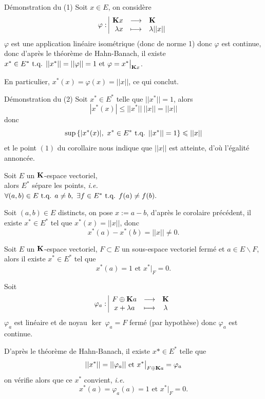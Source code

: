 \documentclass[a4paper,11pt, twoside]{article}
\begin{document}
\begin{ProofC}{Démonstration du (1)}
  Soit $x\in  E$, on considère 
  $$\varphi:\begin{array}{|rcl}
    \mathbf K x&\longrightarrow&\mathbf K\\
    \lambda x&\longmapsto&\lambda||x||
  \end{array}$$
  $\varphi$ est une application linéaire isométrique (donc de norme 1) donc $\varphi$ est continue, donc d'après le théorème de Hahn-Banach, il existe $x^*\in E^*\text{ t.q. } ||x^*||=||\varphi||=1\text{ et }\varphi=x^*\big|_{\mathbf K x}$.

  En particulier, $x^*(x)=\varphi(x)=||x||$, ce qui conclut.
\end{ProofC}


\begin{ProofC}{Démonstration du (2)}
  Soit $x^*\in E^*$ telle que $||x^*||=1$, alors
  $$|x^*(x)|\leqslant ||x^*||\ ||x||=||x||$$
  donc 
  $$\mathrm{sup}\left\{|x^*(x)|,\ x^*\in E^*\text{ t.q. } ||x^*||=1\right\}\leqslant ||x||$$
  et le point $(1)$ du corollaire nous indique que $||x||$ est atteinte, d'où l'égalité annoncée.
\end{ProofC}


\begin{corollaire}
  Soit $E$ un $\mathbf K$-espace vectoriel,\\

  alors $E^*$ sépare les points, \emph{i.e.}\\
  $\forall (a,b)\in E\text{ t.q. } a\neq b,\ \exists f\in E^*\text{ t.q. } f(a)\neq f(b).$
\end{corollaire}


\begin{Proof}
  Soit $(a,b)\in E$ distincts, on pose $x:=a-b$, d'après le corolaire précédent, il existe $x^*\in E^*$ tel que $x^*(x)=||x||$, donc 
  $$x^*(a)-x^*(b)=||x||\neq0.$$
\end{Proof}


\begin{corollaire}
  Soit $E$ un $\mathbf K$-espace vectoriel, $F\subset E$ un sous-espace vectoriel fermé et $a\in E\backslash F$,\\

  alors il existe $x^*\in E^*$ tel que 
  $$x^*(a)=1\text{ et }x^*\big|_F=0.$$
\end{corollaire}


\begin{Proof}
  Soit 
  $$\varphi_a:\begin{array}{|ccc}
    F\oplus \mathbf K a&\longrightarrow&\mathbf K\\
    x+\lambda a&\longmapsto&\lambda
  \end{array}$$
  $\varphi_a$ est linéaire et de noyau $\ker\ \varphi_a=F$ fermé (par hypothèse) donc $\varphi_a$ est continue.

  D'après le théorème de Hahn-Banach, il existe $x*\in E^*$ telle que 
  $$||x^*||=||\varphi_a||\text{ et }x^*\big|_{F\oplus \mathbf K a}=\varphi_a$$
  on vérifie alors que ce $x^*$ convient, \emph{i.e.} 
  $$x^*(a)=\varphi_a(a)=1\text{ et }x^*\big|_F=0.$$
\end{Proof}
\end{document}
